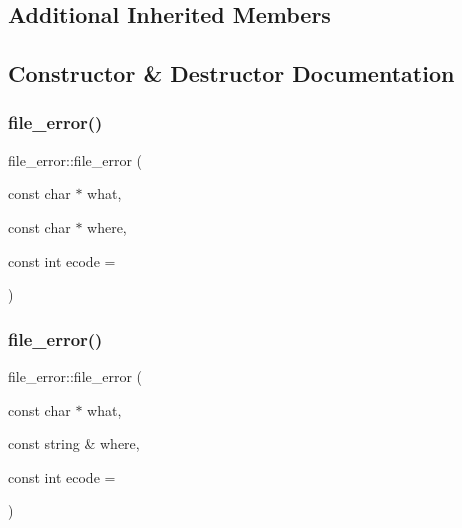 \subsection*{Additional Inherited Members}


\subsection{Constructor \& Destructor Documentation}
\mbox{\label{classfile__error_a10da41c5d15b25fdafa97ae79523e242}} 
\subsubsection{\texorpdfstring{file\+\_\+error()}{file\_error()}\hspace{0.1cm}{\footnotesize\ttfamily [1/4]}}
{\footnotesize\ttfamily file\+\_\+error\+::file\+\_\+error (\begin{DoxyParamCaption}\item[{const char $\ast$}]{what,  }\item[{const char $\ast$}]{where,  }\item[{const int}]{ecode = {} }\end{DoxyParamCaption})}

\mbox{\label{classfile__error_ae70ca16a0a8eee95a88a64128b7fcbad}} 
\subsubsection{\texorpdfstring{file\+\_\+error()}{file\_error()}\hspace{0.1cm}{\footnotesize\ttfamily [2/4]}}
{\footnotesize\ttfamily file\+\_\+error\+::file\+\_\+error (\begin{DoxyParamCaption}\item[{const char $\ast$}]{what,  }\item[{const string \&}]{where,  }\item[{const int}]{ecode = {} }\end{DoxyParamCaption})}

\mbox{\label{classfile__error_a9b1c03f989df972ca3201f984ddece6d}} 
